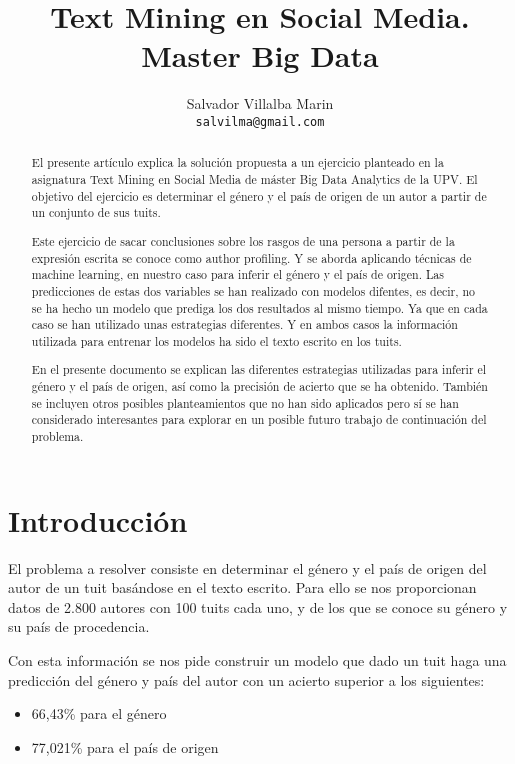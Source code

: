\documentclass[11pt,a4paper]{article}
\title{Text Mining en Social Media. Master Big Data}
\author{Salvador Villalba Marin \\
  {\tt salvilma@gmail.com} \\}
\date{}
\begin{document}
\maketitle
\begin{abstract}
El presente artículo explica la solución propuesta a un ejercicio planteado en la asignatura Text Mining en Social Media de máster Big Data Analytics de la UPV. El objetivo del ejercicio es determinar el género y el país de origen de un autor a partir de un conjunto de sus tuits.

Este ejercicio de sacar conclusiones sobre los rasgos de una persona a partir de la expresión escrita se conoce como author profiling. Y se aborda aplicando técnicas de machine learning, en nuestro caso para inferir el género y el país de origen. Las predicciones de estas dos variables se han realizado con modelos difentes, es decir, no se ha hecho un modelo que prediga los dos resultados al mismo tiempo. Ya que en cada caso se han utilizado unas estrategias diferentes. Y en ambos casos la información utilizada para entrenar los modelos ha sido el texto escrito en los tuits.

En el presente documento se explican las diferentes estrategias utilizadas para inferir el género y el país de origen, así como la precisión de acierto que se ha obtenido. También se incluyen otros posibles planteamientos que no han sido aplicados pero sí se han considerado interesantes para explorar en un posible futuro trabajo de continuación del problema.

\end{abstract}


\section{Introducción}

El problema a resolver consiste en determinar el género y el país de origen del autor de un tuit basándose en el texto escrito. Para ello se nos proporcionan datos de 2.800 autores con 100 tuits cada uno, y de los que se conoce su género y su país de procedencia. 

Con esta información se nos pide construir un modelo que dado un tuit haga una predicción del género y país del autor con un acierto superior a los siguientes:

\begin{itemize}
 \item  66,43\% para el género
 \item 	77,021\% para el país de origen
\end{itemize}
\end{document}
